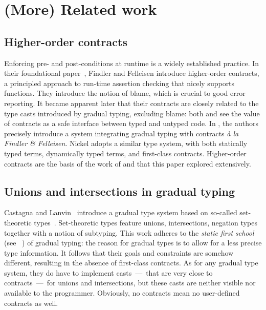 \documentclass[sigplan,10pt,review,anonymous]{acmart}
\newcommand{\unsure}[2][1=]{}
\newcommand{\info}[2][1=]{}
\begin{document}
\section{(More) Related work}
\label{sec:related-work}
\info{Including a mention of statically typed systems with union}

\unsure{WARNING: what is below is being reworked by Yann}

\subsection{Higher-order contracts}

Enforcing pre- and post-conditions at runtime is a widely established practice.
In their foundational paper~\cite{FindlerFelleisenHOContracts}, Findler and
Felleisen introduce higher-order contracts, a principled approach to run-time
assertion checking that nicely supports functions. They introduce the notion of
blame, which is crucial to good error reporting. It became apparent later that
their contracts are closely related to the type casts introduced by gradual
typing, excluding blame: both \cite{FindlerMultiLang} and
\cite{FelleisenInterLang} see the value of contracts as a safe interface between
typed and untyped code. In \cite{WellTypedBlamed}, the authors precisely
introduce a system integrating gradual typing with contracts \textit{à la
Findler \& Felleisen}. Nickel adopts a similar type system, with both statically
typed terms, dynamically typed terms, and first-class contracts. Higher-order
contracts are the basis of the work of \cite{KeilThiemannUnionIntersection}
and \cite{RootCauseOfBlame} that this paper explored extensively.

\subsection{Unions and intersections in gradual typing}

Castagna and Lanvin~\cite{CastagnaLanvinGradualUnionIntersection} introduce a
gradual type system based on so-called set-theoretic
types~\cite{SetTheoreticTypes}.  Set-theoretic types feature unions,
intersections, negation types together with a notion of subtyping. This work
adheres to the \emph{static first school} (see ~\cite{practiceTheoryGrad}) of
gradual typing: the reason for gradual types is to allow for a less precise type
information. It follows that their goals and constraints are somehow different,
resulting in the absence of first-class contracts. As for any gradual type
system, they do have to implement casts~---~that are very close to
contracts~---~for unions and intersections, but these casts are neither visible
nor available to the programmer. Obviously, no contracts mean no user-defined
contracts as well.
\end{document}
